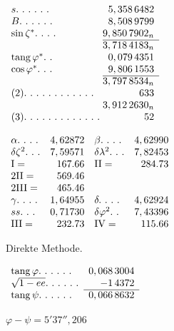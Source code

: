 \begin{minipage}[t]{.317\linewidth}\vspace{0pt}\centering
\(\begin{array}{l@{\;}r}
s\ldotp\,\ldotp\,\ldotp\,\ldotp\,\ldotp\,\ldotp&5,358\,6482\\
B\ldotp\,\ldotp\,\ldotp\,\ldotp\,\ldotp\,\ldotp&8,508\,9799\\
\sin\zeta^*\ldotp\,\ldotp\,\ldotp\,\ldotp&9,850\,7902_n\\\cline{2-2}
&3,718\,4183_n\\
\operatorname{tang}\varphi^*\ldotp\,\ldotp&0,079\,4351\\
\cos\varphi^*\ldotp\,\ldotp\,\ldotp&9,806\,1553\\\cline{2-2}
&3,797\,8534_n\\
(2)\ldotp\,\ldotp\,\ldotp\,\ldotp\,\ldotp\,\ldotp\,\ldotp\,\ldotp\,\ldotp\,\ldotp\,\ldotp\,\ldotp&633\\
&3,912\,2630_n\\
(3)\ldotp\,\ldotp\,\ldotp\,\ldotp\,\ldotp\,\ldotp\,\ldotp\,\ldotp\,\ldotp\,\ldotp\,\ldotp\,\ldotp\,\ldotp&52
\end{array}\)
\end{minipage}\hfill
\begin{minipage}[t]{.387\linewidth}\vspace{0pt}\centering
\(\begin{array}{lr@{\quad}lr}
\alpha\ldotp\,\ldotp\,\ldotp\,\ldotp&4,62872&\beta\ldotp\,\ldotp\,\ldotp\,\ldotp&4,62990\\
\delta\zeta^2\ldotp\,\ldotp\,\ldotp&7,59571&\delta\lambda^2\ldotp\,\ldotp\,\ldotp&7,82453\\
\mathrm{I}=&167.66&\mathrm{II}=&284.73\\
2\mathrm{II}=&569.46&&\\
2\mathrm{III}=&465.46&&\\
\gamma\ldotp\,\ldotp\,\ldotp\,\ldotp&1,64955&\delta\ldotp\,\ldotp\,\ldotp\,\ldotp&4,62924\\
ss\ldotp\,\ldotp\,\ldotp&0,71730&\delta\varphi^2\ldotp\,\ldotp&7,43396\\
\mathrm{III}=&232.73&\mathrm{IV}=&115.66
\end{array}\)
\end{minipage}
\par{}\quad Direkte Methode.
\par\medskip
\noindent\begin{minipage}[t]{.34\linewidth}\vspace{0pt}\centering
\(\begin{array}{lr}
\operatorname{tang}\varphi\ldotp\,\ldotp\,\ldotp\,\ldotp\,\ldotp\,\ldotp&0,068\,3004\\
\sqrt{1-ee}\ldotp\,\ldotp\,\ldotp\,\ldotp\,\ldotp\,\ldotp&-1\,4372\\\cline{2-2}
\operatorname{tang}\psi\ldotp\,\ldotp\,\ldotp\,\ldotp\,\ldotp\,\ldotp&0,066\,8632
\end{array}\)
\par\vspace{7ex}
\(\varphi-\psi=5'37'',206\)
\end{minipage}\hfill
